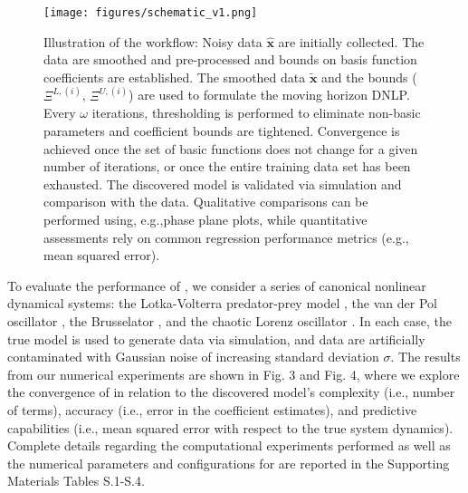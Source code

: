 \documentclass[12pt]{article}
\begin{document}
	

\begin{figure}[h!]
\centering
\texttt{[image: figures/schematic\_v1.png]}
\caption{Illustration of the \ours{} workflow: Noisy data $\hat{\textbf{x}}$ are initially collected. The data are smoothed and pre-processed and bounds on basis function coefficients are established. The smoothed data $\tilde{\textbf{x}}$ and the bounds  ($\Xi^{L,(i)}$, $\Xi^{U,(i)}$) are used to formulate the moving horizon DNLP. Every $\omega$ iterations, thresholding is performed to eliminate non-basic parameters and coefficient bounds are tightened. Convergence is achieved once the set of basic functions does not change for a given number of iterations, or once the entire training data set has been exhausted. The discovered model is validated via simulation and comparison with the data. Qualitative comparisons can be performed using, e.g.,phase plane plots, while quantitative assessments rely on common regression performance metrics (e.g., mean squared error).}
\label{fig:schematic_v1}
\end{figure}


To evaluate the performance of \ours,  we consider a series of canonical nonlinear dynamical systems: the Lotka-Volterra predator-prey model \cite{lotka1925elements,volterra1926fluctuations}, the van der Pol oscillator \cite{van1926lxxxviii}, the Brusselator \cite{prigogine1968symmetry}, and the chaotic Lorenz oscillator \cite{lorenz1963deterministic}. In each case, the true model  is used to generate data via simulation, and data are artificially contaminated with  Gaussian noise of increasing standard deviation $\sigma$. The results from our numerical experiments are shown in Fig. 3 and Fig. 4, where we explore the convergence of \ours{} in relation to the discovered model's complexity (i.e., number of terms), accuracy (i.e., error in the coefficient estimates), and predictive capabilities (i.e., mean squared error with respect to the true system dynamics). Complete details regarding the computational experiments performed as well as the numerical parameters and configurations for \ours{} are reported in the Supporting Materials Tables S.1-S.4.
\end{document}
